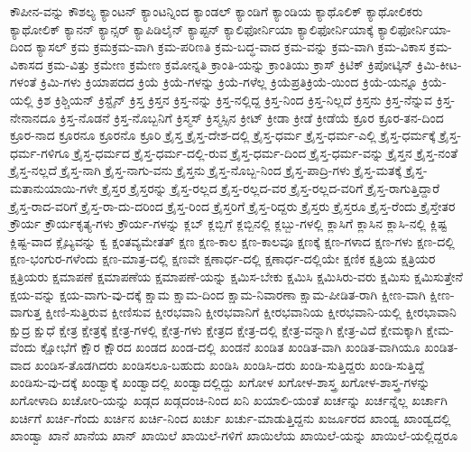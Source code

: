 {ಕೌಪೀನ-ವನ್ನು
ಕೌಶಲ್ಯ
ಕ್ಯಾಂಟನ್
ಕ್ಯಾಂಟನ್ನಿಂದ
ಕ್ಯಾಂಡಲ್
ಕ್ಯಾಂಡಿಗೆ
ಕ್ಯಾಂಡಿಯ
ಕ್ಯಾಥೊಲಿಕ್
ಕ್ಯಾಥೋಲಿಕರು
ಕ್ಯಾಥೋಲಿಕ್
ಕ್ಯಾನನ್
ಕ್ಯಾನ್ಸರ್
ಕ್ಯಾಪಿಡಿಲೈನ್
ಕ್ಯಾಪ್ಟನ್
ಕ್ಯಾಲಿಫೋರ್ನಿಯಾ
ಕ್ಯಾಲಿಫೋರ್ನಿಯಾಕ್ಕೆ
ಕ್ಯಾಲಿಫೋರ್ನಿಯಾ-ದಿಂದ
ಕ್ಯಾಸಲ್
ಕ್ರಮ
ಕ್ರಮಕ್ರಮ-ವಾಗಿ
ಕ್ರಮ-ಪರಿಣತಿ
ಕ್ರಮ-ಬದ್ಧ-ವಾದ
ಕ್ರಮ-ವನ್ನು
ಕ್ರಮ-ವಾಗಿ
ಕ್ರಮ-ವಿಕಾಸ
ಕ್ರಮ-ವಿಕಾಸದ
ಕ್ರಮ-ವಿತ್ತು
ಕ್ರಮೇಣ
ಕ್ರಮೇಣ
ಕ್ರಮೋನ್ನತಿ
ಕ್ರಾಂತಿ-ಯನ್ನು
ಕ್ರಾಂತಿಯು
ಕ್ರಾಸ್
ಕ್ರಿಟಿಕ್
ಕ್ರಿಪೋಟ್ಕಿನ್
ಕ್ರಿಮಿ-ಕೀಟ-ಗಳಂತೆ
ಕ್ರಿಮಿ-ಗಳು
ಕ್ರಿಯಾಪದದ
ಕ್ರಿಯೆ
ಕ್ರಿಯೆ-ಗಳನ್ನು
ಕ್ರಿಯೆ-ಗಳೆಲ್ಲ
ಕ್ರಿಯೆಪ್ರತಿಕ್ರಿಯೆ-ಯಿಂದ
ಕ್ರಿಯೆ-ಯನ್ನೂ
ಕ್ರಿಯೆ-ಯಲ್ಲಿ
ಕ್ರಿಶ
ಕ್ರಿಶ್ಚಿಯನ್
ಕ್ರಿಸ್ಟೈನ್
ಕ್ರಿಸ್ತ
ಕ್ರಿಸ್ತನ
ಕ್ರಿಸ್ತ-ನನ್ನು
ಕ್ರಿಸ್ತ-ನಲ್ಲಿದ್ದ
ಕ್ರಿಸ್ತ-ನಿಂದ
ಕ್ರಿಸ್ತ-ನಿಲ್ಲದೆ
ಕ್ರಿಸ್ತನು
ಕ್ರಿಸ್ತ-ನೆನ್ನುವ
ಕ್ರಿಸ್ತ-ನೇನಾನದೂ
ಕ್ರಿಸ್ತ-ನೊಡನೆ
ಕ್ರಿಸ್ತ-ನೊಬ್ಬನಿಗೆ
ಕ್ರಿಸ್ಮಸ್
ಕ್ರಿಸ್ಮಸ್ಸಿನ
ಕ್ರೀಟ್
ಕ್ರೀಡಾ
ಕ್ರೀಡೆ
ಕ್ರೀಡೆಯೆ
ಕ್ರೂರ
ಕ್ರೂರ-ತನ-ದಿಂದ
ಕ್ರೂರ-ನಾದ
ಕ್ರೂರನೂ
ಕ್ರೂರನೊ
ಕ್ರೂರಿ
ಕ್ರೈಸ್ತ
ಕ್ರೈಸ್ತ-ದೇಶ-ದಲ್ಲಿ
ಕ್ರೈಸ್ತ-ಧರ್ಮ
ಕ್ರೈಸ್ತ-ಧರ್ಮ-ಎಲ್ಲಿ
ಕ್ರೈಸ್ತ-ಧರ್ಮಕ್ಕೆ
ಕ್ರೈಸ್ತ-ಧರ್ಮ-ಗಳಿಗೂ
ಕ್ರೈಸ್ತ-ಧರ್ಮದ
ಕ್ರೈಸ್ತ-ಧರ್ಮ-ದಲ್ಲಿ-ರುವ
ಕ್ರೈಸ್ತ-ಧರ್ಮ-ದಿಂದ
ಕ್ರೈಸ್ತ-ಧರ್ಮ-ವನ್ನು
ಕ್ರೈಸ್ತನ
ಕ್ರೈಸ್ತ-ನಂತೆ
ಕ್ರೈಸ್ತ-ನಲ್ಲದೆ
ಕ್ರೈಸ್ತ-ನಾಗಿ
ಕ್ರೈಸ್ತ-ನಾಗು-ವನು
ಕ್ರೈಸ್ತನು
ಕ್ರೈಸ್ತ-ನೊಬ್ಬ-ನಿಂದ
ಕ್ರೈಸ್ತ-ಪಾದ್ರಿ-ಗಳು
ಕ್ರೈಸ್ತ-ಮತಕ್ಕೆ
ಕ್ರೈಸ್ತ-ಮತಾನುಯಾಯಿ-ಗಳೇ
ಕ್ರೈಸ್ತರ
ಕ್ರೈಸ್ತರನ್ನು
ಕ್ರೈಸ್ತ-ರಲ್ಲದ
ಕ್ರೈಸ್ತ-ರಲ್ಲದ-ವರ
ಕ್ರೈಸ್ತ-ರಲ್ಲದ-ವರಿಗೆ
ಕ್ರೈಸ್ತ-ರಾಗುತ್ತಿದ್ದಾರೆ
ಕ್ರೈಸ್ತ-ರಾದ-ವರಿಗೆ
ಕ್ರೈಸ್ತ-ರಾ-ದು-ದರಿಂದ
ಕ್ರೈಸ್ತ-ರಿಂದ
ಕ್ರೈಸ್ತರಿಗೆ
ಕ್ರೈಸ್ತ-ರಿದ್ದರು
ಕ್ರೈಸ್ತರು
ಕ್ರೈಸ್ತರೂ
ಕ್ರೈಸ್ತ-ರೆಂದು
ಕ್ರೈಸ್ತೇತರ
ಕ್ರೌರ್ಯ
ಕ್ರೌರ್ಯಕೃತ್ಯ-ಗಳು
ಕ್ರೌರ್ಯ-ಗಳನ್ನು
ಕ್ಲಬ್
ಕ್ಲಬ್ಬಿಗೆ
ಕ್ಲಬ್ಬಿನಲ್ಲಿ
ಕ್ಲಬ್ಬು-ಗಳಲ್ಲಿ
ಕ್ಲಾಸಿಗೆ
ಕ್ಲಾಸಿನ
ಕ್ಲಾಸಿ-ನಲ್ಲಿ
ಕ್ಲಿಷ್ಟ
ಕ್ಲಿಷ್ಟ-ವಾದ
ಕ್ಲೈಬ್ಯವನ್ನು
ಕ್ವ
ಕ್ಷಂತವ್ಯಮೇತತ್
ಕ್ಷಣ
ಕ್ಷಣ-ಕಾಲ
ಕ್ಷಣ-ಕಾಲವೂ
ಕ್ಷಣಕ್ಕೆ
ಕ್ಷಣ-ಗಳಾದ
ಕ್ಷಣ-ಗಳು
ಕ್ಷಣ-ದಲ್ಲಿ
ಕ್ಷಣ-ಭಂಗುರ-ಗಳೆಂದು
ಕ್ಷಣ-ಮಾತ್ರ-ದಲ್ಲಿ
ಕ್ಷಣವೇ
ಕ್ಷಣಾರ್ಧ-ದಲ್ಲಿ
ಕ್ಷಣಾರ್ಧ-ದಲ್ಲಿಯೇ
ಕ್ಷಣಿಕ
ಕ್ಷತ್ರಿಯ
ಕ್ಷತ್ರಿಯರ
ಕ್ಷತ್ರಿಯರು
ಕ್ಷಮಾಪಣೆ
ಕ್ಷಮಾಪಣೆಯ
ಕ್ಷಮಾಪಣೆ-ಯನ್ನು
ಕ್ಷಮಿಸ-ಬೇಕು
ಕ್ಷಮಿಸಿ
ಕ್ಷಮಿಸಿರು-ವರು
ಕ್ಷಮಿಸು
ಕ್ಷಮಿಸುತ್ತೇನೆ
ಕ್ಷಯ-ವನ್ನು
ಕ್ಷಯ-ವಾಗು-ವು-ದಕ್ಕೆ
ಕ್ಷಾಮ
ಕ್ಷಾಮ-ದಿಂದ
ಕ್ಷಾಮ-ನಿವಾರಣಾ
ಕ್ಷಾಮ-ಪೀಡಿತ-ರಾಗಿ
ಕ್ಷೀಣ-ವಾಗಿ
ಕ್ಷೀಣ-ವಾಗುತ್ತ
ಕ್ಷೀಣಿ-ಸುತ್ತಿರುವ
ಕ್ಷೀಣಿಸುವ
ಕ್ಷೀರಭವಾನಿ
ಕ್ಷೀರಭವಾನಿಗೆ
ಕ್ಷೀರಭವಾನಿಯ
ಕ್ಷೀರಭವಾನಿ-ಯಲ್ಲಿ
ಕ್ಷೀರಭಾವಾನಿ
ಕ್ಷುದ್ರ
ಕ್ಷುಧೆ
ಕ್ಷೇತ್ರ
ಕ್ಷೇತ್ರಕ್ಕೆ
ಕ್ಷೇತ್ರ-ಗಳಲ್ಲಿ
ಕ್ಷೇತ್ರ-ಗಳು
ಕ್ಷೇತ್ರದ
ಕ್ಷೇತ್ರ-ದಲ್ಲಿ
ಕ್ಷೇತ್ರ-ವನ್ನಾಗಿ
ಕ್ಷೇತ್ರ-ವಿದೆ
ಕ್ಷೇಮಕ್ಕಾಗಿ
ಕ್ಷೇಮ-ವೆಂದು
ಕ್ಷೋಭೆಗೆ
ಕ್ಷೌರ
ಕ್ಷೌರದ
ಖಂಡದ
ಖಂಡ-ದಲ್ಲಿ
ಖಂಡನೆ
ಖಂಡಿತ
ಖಂಡಿತ-ವಾಗಿ
ಖಂಡಿತ-ವಾಗಿಯೂ
ಖಂಡಿತ-ವಾದ
ಖಂಡಿಸ-ತೊಡಗಿದರು
ಖಂಡಿಸಲೂ-ಬಹುದು
ಖಂಡಿಸಿ
ಖಂಡಿಸಿ-ದರು
ಖಂಡಿ-ಸುತ್ತಿದ್ದರು
ಖಂಡಿ-ಸುತ್ತಿದ್ದೆ
ಖಂಡಿಸು-ವು-ದಕ್ಕೆ
ಖಂಡ್ವಾಕ್ಕೆ
ಖಂಡ್ವಾದಲ್ಲಿ
ಖಂಡ್ವಾದಲ್ಲಿದ್ದು
ಖಗೋಳ
ಖಗೋಳ-ಶಾಸ್ತ್ರ
ಖಗೋಳ-ಶಾಸ್ತ್ರ-ಗಳನ್ನು
ಖಗೋಳಾದಿ
ಖಚೋರಿ-ಯನ್ನು
ಖಡ್ಗದ
ಖಡ್ಗದಂಚಿ-ನಿಂದ
ಖನಿ
ಖಯಾಲಿ-ಯಂತೆ
ಖರ್ಚನ್ನು
ಖರ್ಚನ್ನೆಲ್ಲ
ಖರ್ಚಾಗಿ
ಖರ್ಚಿಗೆ
ಖರ್ಚಿ-ಗೆಂದು
ಖರ್ಚಿನ
ಖರ್ಚಿ-ನಿಂದ
ಖರ್ಚು
ಖರ್ಚು-ಮಾಡುತ್ತಿದ್ದನು
ಖರ್ಜೂರದ
ಖಾಂಡ್ವ
ಖಾಂಡ್ವದಲ್ಲಿ
ಖಾಂಡ್ವಾ
ಖಾನೆ
ಖಾನೆಯ
ಖಾನ್
ಖಾಯಿಲೆ
ಖಾಯಿಲೆ-ಗಳಿಗೆ
ಖಾಯಿಲೆಯ
ಖಾಯಿಲೆ-ಯನ್ನು
ಖಾಯಿಲೆ-ಯಲ್ಲಿದ್ದರೂ
}
